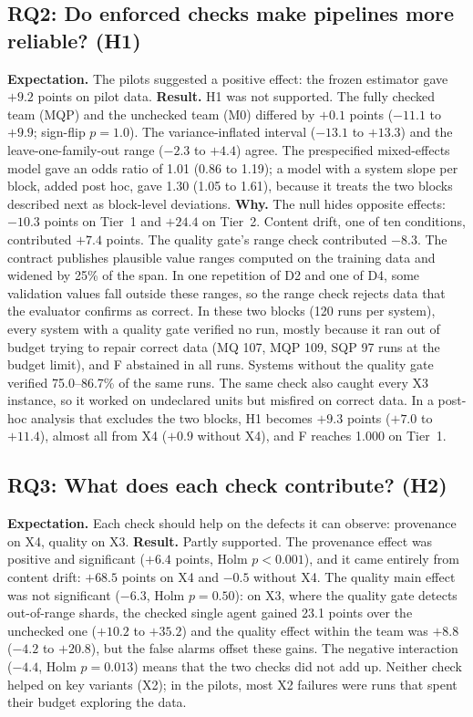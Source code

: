 \documentclass[conference]{IEEEtran}
\newcommand{\sys}[1]{\textsf{#1}}
\begin{document}
\subsection{RQ2: Do enforced checks make pipelines more reliable? (H1)}
\textbf{Expectation.} The pilots suggested a positive effect: the frozen estimator gave $+9.2$ points on pilot data.
\textbf{Result.} H1 was not supported. The fully checked team (\sys{MQP}) and the unchecked team (\sys{M0}) differed by
$+0.1$ points ($-11.1$ to $+9.9$; sign-flip $p=1.0$). The variance-inflated interval ($-13.1$ to $+13.3$) and the
leave-one-family-out range ($-2.3$ to $+4.4$) agree. The prespecified mixed-effects model gave an odds ratio of 1.01
(0.86 to 1.19); a model with a system slope per block, added post hoc, gave 1.30 (1.05 to 1.61), because it treats
the two blocks described next as block-level deviations.
\textbf{Why.} The null hides opposite effects: $-10.3$ points on Tier~1 and $+24.4$ on Tier~2. Content drift, one of ten
conditions, contributed $+7.4$ points. The quality gate's range check contributed $-8.3$. The contract publishes
plausible value ranges computed on the training data and widened by 25\% of the span. In one repetition of D2 and one
of D4, some validation values fall outside these ranges, so the range check rejects data that the evaluator confirms
as correct. In these two blocks (120 runs per system), every system with a quality gate verified no run, mostly
because it ran out of budget trying to repair correct data (\sys{MQ} 107, \sys{MQP} 109, \sys{SQP} 97 runs at the
budget limit), and \sys{F} abstained in all runs. Systems without the quality gate verified 75.0--86.7\% of the same
runs. The same check also caught every X3 instance, so it worked on undeclared units but misfired on correct data. In
a post-hoc analysis that excludes the two blocks, H1 becomes $+9.3$ points ($+7.0$ to $+11.4$), almost all from X4
($+0.9$ without X4), and \sys{F} reaches 1.000 on Tier~1.

\subsection{RQ3: What does each check contribute? (H2)}
\textbf{Expectation.} Each check should help on the defects it can observe: provenance on X4, quality on X3.
\textbf{Result.} Partly supported. The provenance effect was positive and significant ($+6.4$ points, Holm
$p<0.001$), and it came entirely from content drift: $+68.5$ points on X4 and $-0.5$ without X4. The quality main
effect was not significant ($-6.3$, Holm $p=0.50$): on X3, where the quality gate detects out-of-range shards,
the checked single agent gained 23.1 points over the unchecked one ($+10.2$ to $+35.2$) and the quality effect within
the team was $+8.8$ ($-4.2$ to $+20.8$), but the false alarms offset these gains. The negative interaction ($-4.4$, Holm $p=0.013$) means that the two checks
did not add up. Neither check helped on key variants (X2); in the pilots, most X2 failures were runs that spent their budget
exploring the data.
\end{document}
